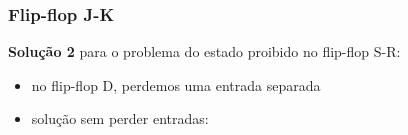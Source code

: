 \documentclass{beamer}
\begin{document}
\begin{frame}
\frametitle{Flip-flop J-K}

\textbf{Solução 2} para o problema do estado proibido no flip-flop S-R:\\
\begin{itemize}
\item no flip-flop D, perdemos uma entrada separada
\item solução sem perder entradas:
\end{itemize}
\hspace*{\fill}%
%
%
\hspace*{\fill}%

\end{frame}
\end{document}
